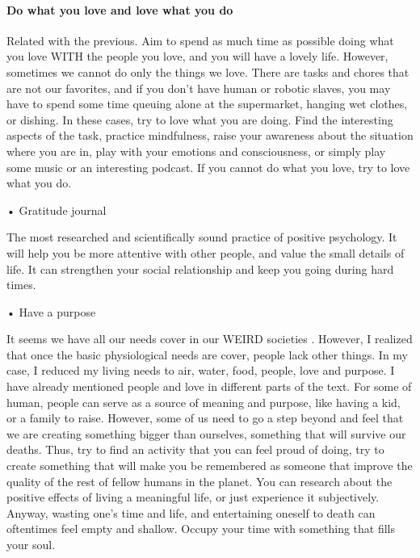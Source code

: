\documentclass{article}
\begin{document}
\paragraph{Do what you love and love what you do}
Related with the previous. Aim to spend as much time as possible doing what you love WITH the people you love, and you will have a lovely life. However, sometimes we cannot do only the things we love. There are tasks and chores that are not our favorites, and if you don’t have human or robotic slaves, you may have to spend some time queuing alone at the supermarket, hanging wet clothes, or dishing. In these cases, try to love what you are doing. Find the interesting aspects of the task, practice mindfulness, raise your awareness about the situation where you are in, play with your emotions and consciousness, or simply play some music or an interesting podcast. If you cannot do what you love, try to love what you do.

•	Gratitude journal

The most researched and scientifically sound practice of positive psychology. It will help you be more attentive with other people, and value the small details of life. It can strengthen your social relationship and keep you going during hard times. 

•	Have a purpose

It seems we have all our needs cover in our WEIRD  societies \cite{henrich2010weirdest}. However, I realized that once the basic physiological needs are cover, people lack other things. In my case, I reduced my living needs to air, water, food, people, love and purpose. I have already mentioned people and love in different parts of the text. For some of human, people can serve as a source of meaning and purpose, like having a kid, or a family to raise. However, some of us need to go a step beyond and feel that we are creating something bigger than ourselves, something that will survive our deaths. Thus, try to find an activity that you can feel proud of doing, try to create something that will make you be remembered as someone that improve the quality of the rest of fellow humans in the planet. You can research about the positive effects of living a meaningful life, or just experience it subjectively. Anyway, wasting one’s time and life, and entertaining oneself to death can oftentimes feel empty and shallow. Occupy your time with something that fills your soul.
\end{document}

